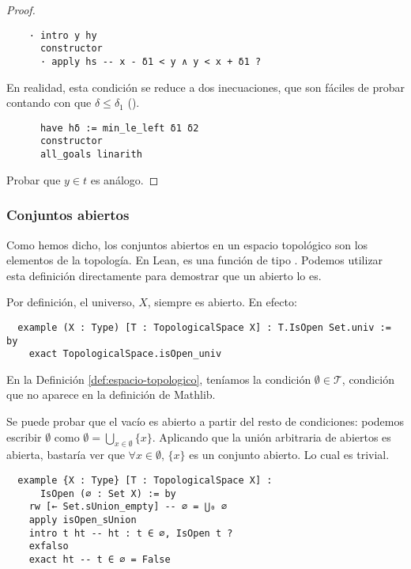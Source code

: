 \begin{proof}
  \begin{lstlisting}
    · intro y hy
      constructor
      · apply hs -- x - δ1 < y ∧ y < x + δ1 ? \end{lstlisting}

  En realidad, esta condición se reduce a dos inecuaciones, que son fáciles de probar contando con que $\delta \leq \delta_1$ ().

  \begin{lstlisting}
      have hδ := min_le_left δ1 δ2
      constructor
      all_goals linarith \end{lstlisting}

  Probar que $y \in t$ es análogo.
  
\end{proof}


\subsubsection{Conjuntos abiertos}

Como hemos dicho, los conjuntos abiertos en un espacio topológico son los elementos de la topología. En Lean, es una función  de tipo . Podemos utilizar esta definición directamente para demostrar que un abierto lo es.

\begin{example} 
    Por definición, el universo, $X$, siempre es abierto. En efecto:
\end{example}

\begin{lstlisting}
  example (X : Type) [T : TopologicalSpace X] : T.IsOpen Set.univ := by
    exact TopologicalSpace.isOpen_univ \end{lstlisting}

\begin{example}
  En la Definición \ref{def:espacio-topologico}, teníamos la condición $\emptyset \in \mathcal{T}$, condición que no aparece en la definición de Mathlib.

  Se puede probar que el vacío es abierto a partir del resto de condiciones: podemos escribir $\emptyset$ como $\emptyset = \bigcup_{x \in \emptyset} \{x\}$. Aplicando que la unión arbitraria de abiertos es abierta, bastaría ver que $\forall x \in \emptyset$, $\{x\}$ es un conjunto abierto. Lo cual es trivial.
\end{example}

\begin{lstlisting}
  example {X : Type} [T : TopologicalSpace X] :
      IsOpen (∅ : Set X) := by
    rw [← Set.sUnion_empty] -- ∅ = ⋃₀ ∅
    apply isOpen_sUnion
    intro t ht -- ht : t ∈ ∅, IsOpen t ?
    exfalso
    exact ht -- t ∈ ∅ = False
\end{lstlisting}
  
